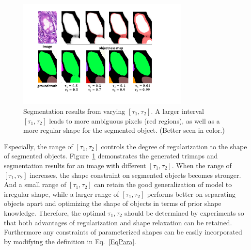 \begin{figure}
    \begin{center}
        \includegraphics[width=3.4in]{figures/FigFusion.pdf}
    \end{center}
    \caption{Segmentation results from varying $[\tau_1,\tau_2]$. A larger interval $[\tau_1,\tau_2]$ leads to more ambiguous pixels (red regions), as well as a more regular shape for the segmented object. (Better seen in color.)}
    \label{FigFusion}
\end{figure}


Especially, the range of $[\tau_1,\tau_2]$ controls the degree of regularization to the shape of segmented objects.
Figure~\ref{FigFusion} demonstrates the generated trimaps and segmentation results for an image with different $[\tau_1,\tau_2]$.
%
When the range of $[\tau_1,\tau_2]$ increases, the shape constraint on segmented objects becomes stronger.
And a small range of $[\tau_1,\tau_2]$ can retain the good generalization of model to irregular shape, while a larger range of $[\tau_1,\tau_2]$ performs better on separating objects apart and optimizing the shape of objects in terms of prior shape knowledge.
Therefore, the optimal $\tau_1, \tau_2$ should be determined by experiments so that both advantages of regularization and shape relaxation can be retained.
%
Furthermore any constraints of parameterized shapes can be easily incorporated by modifying the definition in Eq.~\ref{EqPara}.

